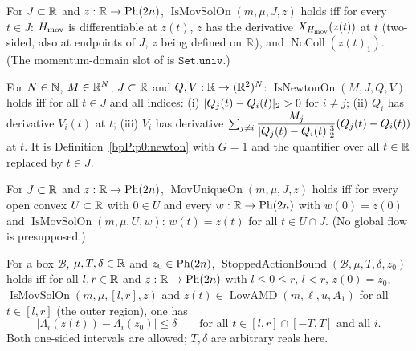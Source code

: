 \begin{definition}\label{bpP:p0:d25-movsol}
For $J\subset\mathbb{R}$ and $z:\mathbb{R}\to\mathrm{Ph}(2n)$, $\operatorname{IsMovSolOn}(m,\mu,J,z)$ holds iff for every $t\in J$: $H_{\rm mov}$ is differentiable at $z(t)$, $z$ has the derivative
$X_{H_{\rm mov}}(z(t))$ at $t$ (two-sided, also at endpoints of $J$, $z$ being defined on $\mathbb{R}$), and $\operatorname{NoColl}(z(t)_1)$. (The momentum-domain slot of  is $\texttt{Set.univ}$.)
\end{definition}

\begin{definition}\label{bpP:p0:d25-newton}
For $N\in\mathbb{N}$, $M\in\mathbb{R}^N$, $J\subset\mathbb{R}$ and $Q,V:\mathbb{R}\to(\mathbb{R}^2)^N$: $\operatorname{IsNewtonOn}(M,J,Q,V)$ holds iff for all $t\in J$ and all indices: (i) $\lvert Q_j(t)-Q_i(t)\rvert_2>0$ for $i\ne j$; (ii) $Q_i$ has derivative $V_i(t)$ at $t$;
(iii) $V_i$ has derivative $\sum_{j\ne i}\dfrac{M_j}{\lvert Q_j(t)-Q_i(t)\rvert_2^3}(Q_j(t)-Q_i(t))$ at $t$. It is Definition~\ref{bpP:p0:newton} with $G=1$ and the quantifier over all $t\in\mathbb{R}$ replaced by $t\in J$.
\end{definition}

\begin{definition}\label{bpP:p0:d25-unique}
For $J\subset\mathbb{R}$ and $z:\mathbb{R}\to\mathrm{Ph}(2n)$, $\operatorname{MovUniqueOn}(m,\mu,J,z)$ holds iff for every open convex $U\subset\mathbb{R}$ with $0\in U$ and every $w:\mathbb{R}\to\mathrm{Ph}(2n)$ with $w(0)=z(0)$ and
$\operatorname{IsMovSolOn}(m,\mu,U,w)$: $w(t)=z(t)$ for all $t\in U\cap J$. (No global flow is presupposed.)
\end{definition}

\begin{definition}\label{bpP:p0:d25-stopped}
For a box $\mathcal B$, $\mu,T,\delta\in\mathbb{R}$ and $z_0\in\mathrm{Ph}(2n)$, $\operatorname{StoppedActionBound}(\mathcal B,\mu,T,\delta,z_0)$ holds iff for all $l,r\in\mathbb{R}$ and $z:\mathbb{R}\to\mathrm{Ph}(2n)$ with $l\le0\le r$, $l<r$, $z(0)=z_0$,
$\operatorname{IsMovSolOn}(m,\mu,[l,r],z)$ and $z(t)\in\operatorname{LowAMD}(m,\ell,u,A_1)$ for all $t\in[l,r]$ (the outer region), one has
\[\bigl\lvert\Lambda_i(z(t))-\Lambda_i(z_0)\bigr\rvert\le\delta\qquad\text{for all }t\in[l,r]\cap[-T,T]\text{ and all }i.\]
Both one-sided intervals are allowed; $T,\delta$ are arbitrary reals here.
\end{definition}

